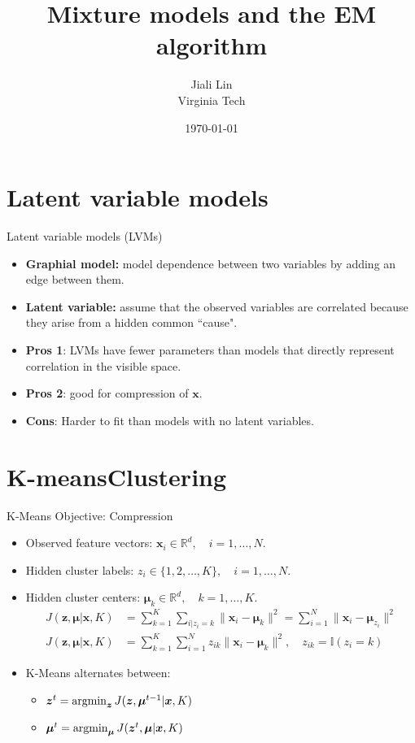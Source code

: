 \documentclass[10pt,mathserif]{beamer}
\title{\large \bfseries Mixture models and the EM algorithm}
\author{Jiali Lin\\[3ex]
Virginia Tech}
\date{\today}
\begin{document}
\frame{
\thispagestyle{empty}
\titlepage
}

\section{Latent variable models}
\begin{frame}{Latent variable models (LVMs)}
\begin{itemize}
    \item \textbf{Graphial model:} model dependence between two variables by adding an edge between them.
    \item \textbf{Latent variable:} assume that the observed variables are correlated because they arise from a hidden common ``cause".
    \item \textbf{Pros 1}: LVMs have fewer parameters than models that directly represent correlation in the visible space.
    \item \textbf{Pros 2}: good for compression of $\bm{x}$.
    \item \textbf{Cons}: Harder to fit than models with no latent variables.
\end{itemize}
\end{frame}

\section{K-meansClustering}
\begin{frame}{K-Means Objective: Compression}
\begin{itemize}
    \item Observed feature vectors: $\bm{x}_i\in\mathbb{R}^d, \quad i=1,\ldots,N$.
    \item Hidden cluster labels: $z_i\in\{1,2,\ldots,K\}, \quad i=1,\ldots,N$.
    \item Hidden cluster centers: $\bm{\mu}_k\in\mathbb{R}^d, \quad k=1,\ldots,K$.
    \begin{equation*}
        \begin{split}
            J(\bm{z},\bm{\mu}|\bm{x},K) & = \sum_{k=1}^K \sum_{i|z_i=k}\|\bm{x}_i-\bm{\mu}_k\|^2 = \sum_{i=1}^N \|\bm{x}_i-\bm{\mu}_{z_i}\|^2\\
            J(\bm{z},\bm{\mu}|\bm{x},K) & = \sum_{k=1}^K \sum_{i=1}^N z_{ik}\|\bm{x}_i-\bm{\mu}_k\|^2, \quad z_{ik} = \mathbb{I}(z_i = k)
        \end{split}
    \end{equation*}
    \item K-Means alternates between:
    \begin{itemize}
        \item $\bm{z}^{t} = \mathop{\rm argmin}_{\bm{z}} J(\bm{z},\bm{\mu}^{t-1}|\bm{x},K)$
        \item $\bm{\mu}^{t} = \mathop{\rm argmin}_{\bm{\mu}} J(\bm{z}^t,\bm{\mu}|\bm{x},K)$    
    \end{itemize}
\end{itemize}
\end{frame}
\end{document}
